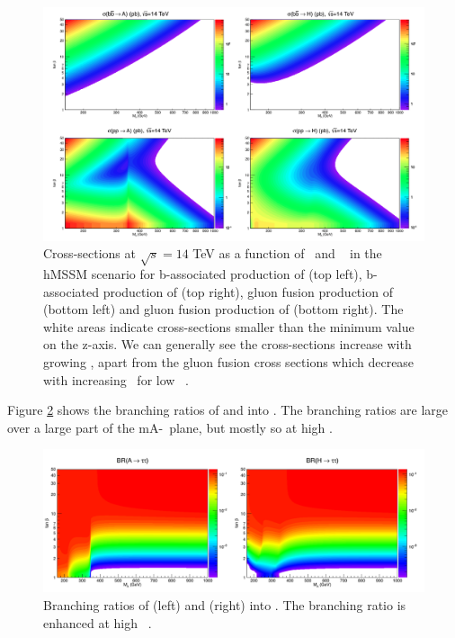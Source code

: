 \begin{figure}[h!]
\includegraphics[width=\textwidth]{./Theory/Figures/hmssm_xsAH.png}
\caption{Cross-sections at $\sqrt{s}=14$ TeV as a function of
\mA~and \tanb~ in 
the hMSSM scenario for b-associated production of \PHiggsps (top left), b-associated
production of \PHiggs (top right), gluon fusion production of \PHiggsps (bottom left) and
gluon fusion production of \PHiggs (bottom right). The white areas indicate cross-sections
smaller than the minimum value on the z-axis. We can generally see the cross-sections increase
with growing \tanb, apart from the gluon fusion cross sections which decrease with increasing
\tanb~for low \tanb~\cite{hMSSM-2}.}
\label{fig:hmssm_xs}
\end{figure}

Figure \ref{fig:hmssm_brtautau} shows the branching ratios of \PHiggsps and \PHiggs into \Pgt\Pgt.
The branching ratios are large over a large part of the mA-\tanb~plane, but mostly so
at high \tanb.

\begin{figure}[h!]
\includegraphics[width=\textwidth]{./Theory/Figures/hmssm_brtautau.png}
\caption{Branching ratios of \PHiggsps (left) and \PHiggs (right) into \tautau. The
branching ratio is enhanced at high \tanb~\cite{hMSSM-2}.} 
\label{fig:hmssm_brtautau}
\end{figure}


